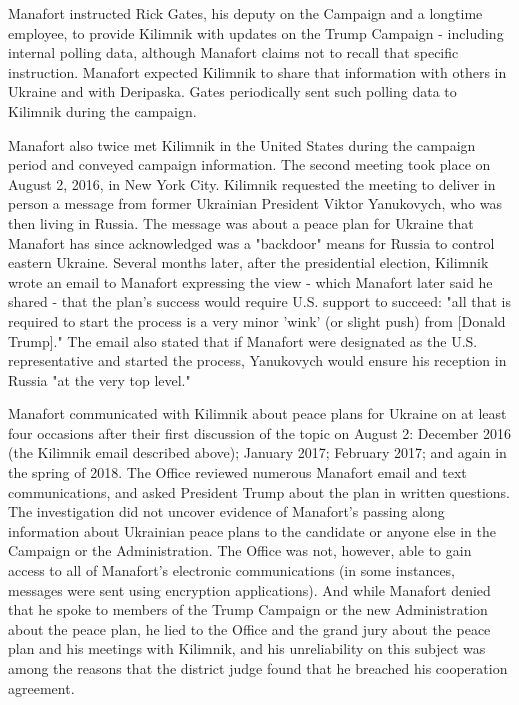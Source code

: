 Manafort instructed Rick Gates, his deputy on the Campaign and a longtime employee, %
to provide Kilimnik with updates on the Trump Campaign - including internal polling data, although Manafort claims not to recall that specific instruction.
Manafort expected Kilimnik to share that information with others in Ukraine and with Deripaska.
Gates periodically sent such polling data to Kilimnik during the campaign.

Manafort also twice met Kilimnik in the United States during the campaign period and conveyed campaign information.
The second meeting took place on August 2, 2016, in New York City.
Kilimnik requested the meeting to deliver in person a message from former Ukrainian President Viktor Yanukovych, who was then living in Russia.
The message was about a peace plan for Ukraine that Manafort has since acknowledged was a "backdoor" means for Russia to control eastern Ukraine.
Several months later, after the presidential election, Kilimnik wrote an email to Manafort expressing the view - which Manafort later said he shared - that the plan's success would require U.S. support to succeed: "all that is required to start the process is a very minor 'wink' (or slight push) from [Donald Trump]."%
The email also stated that if Manafort were designated as the U.S. representative and started the process, Yanukovych would ensure his reception in Russia "at the very top level."

Manafort communicated with Kilimnik about peace plans for Ukraine on at least four occasions after their first discussion of the topic on August 2: December 2016 (the Kilimnik email described above); January 2017; February 2017; and again in the spring of 2018.
The Office reviewed numerous Manafort email and text communications, and asked President Trump about the plan in written questions.%
The investigation did not uncover evidence of Manafort's passing along information about Ukrainian peace plans to the candidate or anyone else in the Campaign or the Administration.
The Office was not, however, able to gain access to all of Manafort's electronic communications (in some instances, messages were sent using encryption applications).
And while Manafort denied that he spoke to members of the Trump Campaign or the new Administration about the peace plan, he lied to the Office and the grand jury about the peace plan and his meetings with Kilimnik, and his unreliability on this subject was among the reasons that the district judge found that he breached his cooperation agreement.%

